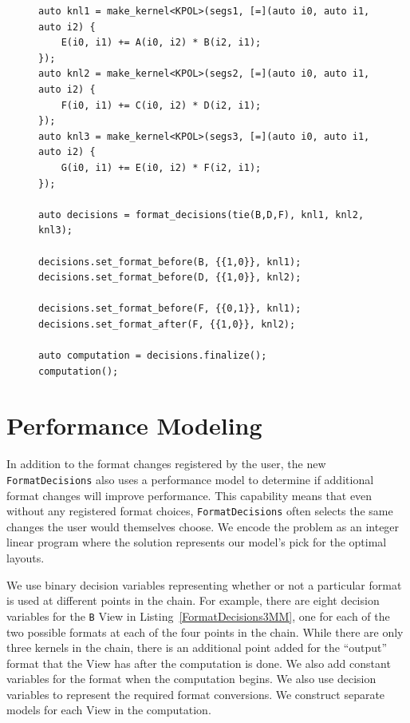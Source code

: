 \documentclass[sigconf]{acmart}
\begin{document}
\begin{figure}
\begin{lstlisting}[caption={The 3MM benchmark implemented using FormatDecisions.},
	label={FormatDecisions3MM}]
auto knl1 = make_kernel<KPOL>(segs1, [=](auto i0, auto i1, auto i2) {
	E(i0, i1) += A(i0, i2) * B(i2, i1);
});
auto knl2 = make_kernel<KPOL>(segs2, [=](auto i0, auto i1, auto i2) {
	F(i0, i1) += C(i0, i2) * D(i2, i1);
});
auto knl3 = make_kernel<KPOL>(segs3, [=](auto i0, auto i1, auto i2) {
	G(i0, i1) += E(i0, i2) * F(i2, i1);
});

auto decisions = format_decisions(tie(B,D,F), knl1, knl2, knl3);

decisions.set_format_before(B, {{1,0}}, knl1);
decisions.set_format_before(D, {{1,0}}, knl2);

decisions.set_format_before(F, {{0,1}}, knl1);
decisions.set_format_after(F, {{1,0}}, knl2);

auto computation = decisions.finalize();
computation();
\end{lstlisting}
\end{figure}


\section{Performance Modeling}

In addition to the format changes registered by the user, the new \verb.FormatDecisions. also uses a performance model to determine if additional format changes will improve performance. 
This capability means that even without any registered format choices, \verb.FormatDecisions. often selects the same changes the user would themselves choose. 
We encode the problem as an integer linear program where the solution represents our model's pick for the optimal layouts.


We use binary decision variables representing whether or not a particular format is used at different points in the chain. 
For example, there are eight decision variables for the \verb.B. View in Listing~\ref{FormatDecisions3MM}, one for each of the two possible formats at each of the four points in the chain. 
While there are only three kernels in the chain, there is an additional point added for the \enquote{output} format that the View has after the computation is done.
We also add constant variables for the format when the computation begins. 
We also use decision variables to represent the required format conversions.
We construct separate models for each View in the computation. 
\end{document}
